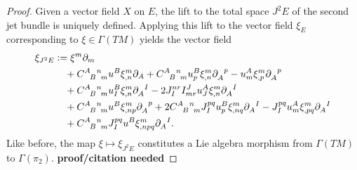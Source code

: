 \begin{proof}
  Given a vector field $X$ on $E$, the lift to the total space $J^2E$ of the second jet bundle is uniquely defined\cite{saunders_jet_bundles}. Applying this lift to the vector field $\xi_E$ corresponding to $\xi\in \Gamma(TM)$ yields the vector field
  \begin{equation}\label{vector_field_2nd_prolongation}
    \begin{aligned}
      \xi_{J^2E} &{} \vcentcolon= \xi^m\partial_m \\
                 &{} \hphantom{\vcentcolon=} + \gmc{A}{B}{n}{m} u^B \xi^m_{,n}\partial_A + \gmc{A}{B}{n}{m} u^B_p\xi^m_{,n}\partial_A^{\hphantom Ap} - u^A_m\xi^m_{,p}\partial_A^{\hphantom Ap} \\
                 &{} \hphantom{\vcentcolon=} + \gmc{A}{B}{n}{m} u^B_I \xi^m_{,n} \partial_A^{\hphantom AI} - 2 J_I^{nr}I^J_{mr}u^A_J\xi^m_{,n}\partial_A^{\hphantom AI} \\
                 &{} \hphantom{\vcentcolon=} + \gmc{A}{B}{n}{m} u^B \xi^m_{,np} \partial_A^{\hphantom Ap} + 2 \gmc{A}{B}{n}{m} J_I^{pq} u^B_p \xi^m_{,nq} \partial_A^{\hphantom AI} - J_I^{pq} u^A_m \xi^m_{,pq} \partial_A^{\hphantom AI} \\
                 &{} \hphantom{\vcentcolon=} + \gmc{A}{B}{n}{m} J_I^{pq} u^B \xi^m_{,npq} \partial_A^{\hphantom AI}.
    \end{aligned}
  \end{equation}
  Like before, the map $\xi\mapsto\xi_{J^2E}$ constitutes a Lie algebra morphism from $\Gamma(TM)$ to $\Gamma(\pi_2)$. \textbf{proof/citation needed}


\end{proof}
